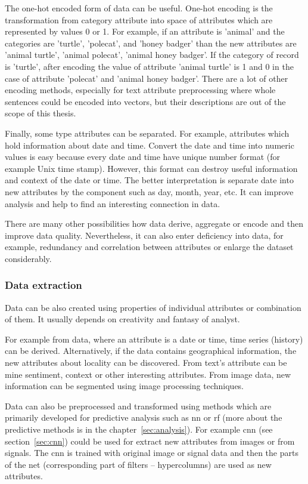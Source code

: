 \documentclass[thesis=M,english]{FITthesis}[2012/10/20]
\begin{document}
The one-hot encoded form of data can be useful.\cite[45]{Chapman2000crisp} One-hot encoding is the transformation from category attribute into space of attributes which are represented by values 0 or 1. For example, if an attribute is 'animal' and the categories are 'turtle', 'polecat', and 'honey badger' than the new attributes are 'animal turtle', 'animal polecat', 'animal honey badger'. If the category of record is 'turtle', after encoding the value of attribute 'animal turtle' is 1 and 0 in the case of attribute 'polecat' and 'animal honey badger'. There are a lot of other encoding methods, especially for text attribute preprocessing where whole sentences could be encoded into vectors, but their descriptions are out of the scope of this thesis.

Finally, some type attributes can be separated.\cite[45]{Chapman2000crisp} For example, attributes which hold information about date and time. Convert the date and time into numeric values is easy because every date and time have unique number format (for example Unix time stamp). However, this format can destroy useful information and context of the date or time. The better interpretation is separate date into new attributes by the component such as day, month, year, etc. It can improve analysis and help to find an interesting connection in data. 

There are many other possibilities how data derive, aggregate or encode and then improve data quality. Nevertheless, it can also enter deficiency into data, for example, redundancy and correlation between attributes or enlarge the dataset considerably.

\subsubsection{Data extraction}

Data can be also created using properties of individual attributes or combination of them. It usually depends on creativity and fantasy of analyst.

For example from data, where an attribute is a date or time, time series (history) can be derived. Alternatively, if the data contains geographical information, the new attributes about locality can be discovered. From text's attribute can be mine sentiment, context or other interesting attributes. From image data, new information can be segmented using image processing techniques. 

Data can also be preprocessed and transformed using methods which are primarily developed for predictive analysis such as \gls{nn} or \gls{rf} (more about the predictive methods is in the chapter~\ref{sec:analysis}). For example \gls{cnn} (see section~\ref{sec:cnn}) could be used for extract new attributes from images or from signals. The \gls{cnn} is trained with original image or signal data and then the parts of the net (corresponding part of filters -- hypercolumns) are used as new attributes.\cite{Perone2016hypercolumns} 
\end{document}
